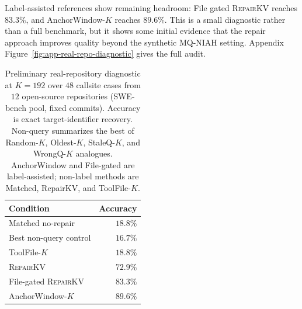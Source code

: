 \documentclass{article}
\newcommand{\repairkv}{\textsc{RepairKV}}
\begin{document}
Label-assisted references show remaining headroom: File gated \repairkv{} reaches $83.3\%$, and AnchorWindow-$K$ reaches $89.6\%$. This is a small diagnostic rather than a full benchmark, but it shows some initial evidence that the repair approach improves quality beyond the synthetic MQ-NIAH setting. Appendix Figure~\ref{fig:app-real-repo-diagnostic} gives the full audit.
\begin{table}[!ht]
  \centering
  \setlength{\tabcolsep}{5pt}
  \caption{Preliminary real-repository diagnostic at $K=192$ over $48$
  callsite cases from $12$ open-source repositories
  (SWE-bench pool, fixed commits). Accuracy is
  exact target-identifier recovery. Non-query summarizes the
  best of Random-$K$, Oldest-$K$, StaleQ-$K$, and WrongQ-$K$ analogues. AnchorWindow
  and File-gated are label-assisted; non-label methods are Matched,
  RepairKV, and ToolFile-$K$.}
  \label{tab:real-repo-diagnostic}
  \begin{tabular}{@{}lr@{}}
    \toprule
    Condition & Accuracy \\
    \midrule
    Matched no-repair & $18.8\%$ \\
    Best non-query control & $16.7\%$ \\
    ToolFile-$K$ & $18.8\%$ \\
    \repairkv{} & $72.9\%$ \\
    File-gated \repairkv{} & $83.3\%$ \\
    AnchorWindow-$K$ & $89.6\%$ \\
    \bottomrule
  \end{tabular}
\end{table}
\end{document}
